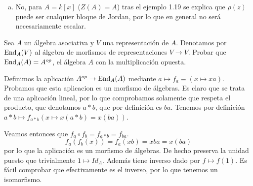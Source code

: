 \documentclass[twoside]{article}
\begin{document}
\begin{solucion}
\begin{enumerate}[(a)]
\item No, para $A=k[x]$ ($Z(A)=A$) tras el ejemplo 1.19 se explica que $\rho(z)$ puede ser cualquier bloque de Jordan, por lo que en general no será necesariamente escalar. 

\end{enumerate}
\end{solucion}

\newpage

\begin{ejercicio}{1.22}
Sea $A$ un álgebra asociativa y $V$ una representación de $A$. Denotamos por $\operatorname{End}_A(V)$ al álgebra de morfismos de representaciones $V\to V$. Probar que $\operatorname{End}_A(A)=A^{op}$, el álgebra $A$ con la multiplicación opuesta.
\end{ejercicio}
\begin{solucion}
Definimos la aplicación $A^{op}\to \operatorname{End}_A(A)$ mediante $a\mapsto f_a \equiv (x\mapsto xa)$. Probamos que esta aplicacion es un morfismo de álgebras. Es claro que se trata de una aplicación lineal, por lo que comprobamos solamente que respeta el producto, que denotamos $a*b$, que por definición es $ba$. Tenemos por definición $a*b\mapsto f_{a*b}(x\mapsto x(a*b)=x(ba))$.

Veamos entonces que $f_a\circ f_b=f_{a*b}=f_{ba}$. 
\[
f_a(f_b(x))=f_a(xb)=xba=x(ba)
\]
por lo que la aplicación es un morfismo de álgebras. De hecho preserva la unidad puesto que trivialmente $1\mapsto Id_A$. Además tiene inverso dado por $f\mapsto f(1)$. Es fácil comprobar que efectivamente es el inverso, por lo que tenemos un isomorfismo. 
\end{solucion}
\end{document}
